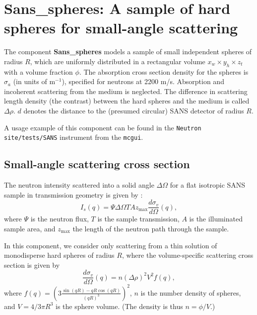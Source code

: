 \section{Sans\_spheres: A sample of hard spheres for small-angle scattering}
\label{sans}


The component \textbf{Sans\_spheres} models a sample of small independent
spheres of radius $R$, which are uniformly distributed
in a rectangular volume $x_w \times y_h \times z_t$ with a volume
fraction $\phi$. The absorption cross section density for the spheres
is $\sigma_a$ (in units of m$^{-1}$), specified
for neutrons at 2200 m/s. Absorption and incoherent scattering
from the medium is neglected.
The difference in scattering length density
(the contrast) between the hard spheres and the medium is called $\Delta \rho$.
$d$ denotes the distance to the (presumed circular) SANS detector of radius $R$.

A usage example of this component can be found in the \verb+Neutron site/tests/SANS+ instrument from the \verb+mcgui+.

\subsection{Small-angle scattering cross section}
The neutron intensity scattered into a solid angle $\Delta \Omega$
for a flat isotropic SANS sample in transmission geometry
is given by \cite{ILLblue}:
\begin{equation}
I_s(q) = \Psi \Delta\Omega T A z_\textrm{max} \frac{d\sigma_v}{d\Omega}(q) ,
\end{equation}
where $\Psi$ is the neutron flux, $T$ is the sample transmission,
$A$ is the illuminated sample area, and $z_\textrm{max}$ the length of
the neutron path through the sample.

In this component, we consider only scattering from a thin solution
of monodisperse hard spheres of radius $R$, where the volume-specific
scattering cross section is given by \cite{ILLblue}
\begin{equation}
\frac{d\sigma_v}{d\Omega}(q) =
  n (\Delta\rho)^2 V^2 f(q)  ,
\end{equation}
where $f(q) = \left( 3\frac{\sin(qR)-qR\cos(qR)}{(qR)^3} \right)^2$,
$n$ is the number density of spheres, and $V = 4 / 3 \pi R^3$ is the
sphere volume. (The density is thus $n = \phi/V$.)

